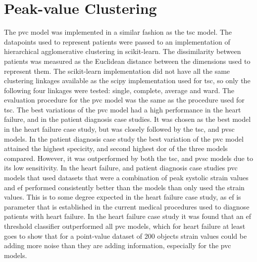 \section{Peak-value Clustering}
The \acrshort{pvc} model was implemented in a similar fashion as the \acrshort{tsc} model.
The datapoints used to represent patients were passed to an implementation of hierarchical agglomerative clustering in scikit-learn. The dissimilarity between patients was measured as the Euclidean distance between the dimensions used to represent them. The scikit-learn implementation did not have all the same clustering linkages available as the scipy implementation used for \acrshort{tsc}, so only the following four linkages were tested: single, complete, average and ward. The evaluation procedure for the \acrshort{pvc} model was the same as the procedure used for \acrshort{tsc}. \bigskip
The best variations of the \acrshort{pvc} model had a high performance in the heart failure, and in the patient diagnosis case studies. It was chosen as the best model in the heart failure case study, but was closely followed by the \acrshort{tsc}, and \acrshort{pvsc} models. In the patient diagnosis case study the best variation of the \acrshort{pvc} model attained the highest specicity, and second highest \acrshort{dor} of the three models compared. However, it was outperformed by both the \acrshort{tsc}, and \acrshort{pvsc} models due to its low sensitivity. \bigskip
In the heart failure, and patient diagnosis case studies \acrshort{pvc} models that used datasets that were a combination of peak systolic strain values and \acrshort{ef} performed consistently better than the models than only used the strain values. This is to some degree expected in the heart failure case study, as \acrshort{ef} is parameter that is established in the current medical procedures used to diagnose patients with heart failure. In the heart failure case study it was found that an \acrshort{ef} threshold classifier outperformed all \acrshort{pvc} models, which for heart failure at least goes to show that for a point-value dataset of 200 objects strain values could be adding more noise than they are adding information, especially for the \acrshort{pvc} models. \bigskip
